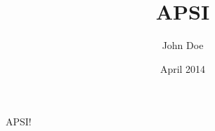 \documentclass{article}
\title{APSI}
\author{John Doe}
\date{April 2014}
\begin{document}
   \maketitle
   APSI!
\end{document}
